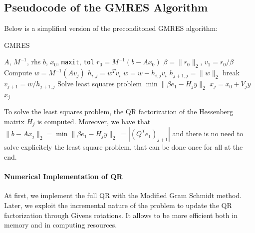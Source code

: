 \documentclass[hidelinks]{article}
\begin{document}
\subsection{Pseudocode of the GMRES Algorithm}

Below is a simplified version of the preconditoned GMRES algorithm:

\begin{algorithm}[H]
\caption{GMRES}
\begin{algorithmic}
\Require $A$, $M^{-1}$, rhs $b$, $x_0$, \texttt{maxit}, \texttt{tol}
\State \( r_0 = M^{-1}(b - Ax_0) \)
\State \( \beta = \|r_0\|_2 \), \( v_1 = r_0 / \beta \)
    \State Compute \( w = M^{-1}(Av_j) \)
        \State \( h_{i,j} = w^T v_i \)
        \State \( w = w - h_{i,j} v_i \)
    \EndFor
    \State \( h_{j+1,j} = \|w\|_2 \)
     
        \State break
    \EndIf
    \State \( v_{j+1} = w / h_{j+1,j} \)
    \State Solve least squares problem \( \min \| \beta e_1 - H_j y \|_2 \)
    \State \( x_j = x_0 + V_j y \)
        \State \Return \( x_j \)
    \EndIf
\EndFor
\end{algorithmic}
\end{algorithm}

To solve the least squares problem, the QR factorization of the Hessenberg matrix $H_j$ is computed. Moreover, we have that $ \| b - Ax_j \|_2 = \min \| \beta e_1 - H_j y \|_2 \ = |(Q^Te_1)_{j+1}|$ and there is no need to solve explicitely the least square problem, that can be done once for all at the end.

\paragraph{Numerical Implementation of QR}
At first, we implement the full QR with the Modified Gram Schmidt method. Later, we exploit the incremental nature of the problem to update the QR factorization through Givens rotations. It allows to be more efficient both in memory and in computing resources.
\end{document}
